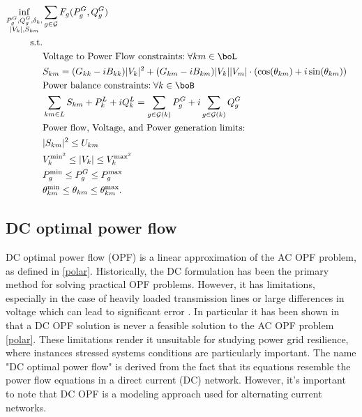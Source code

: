 \documentclass[11pt,a4paper,oneside,openany]{book}
\numberwithin{definition}{section}
\numberwithin{theorem}{section}
\numberwithin{problem}{section}
\begin{document}
\begin{adjustwidth}{-1.5cm}{-1.5cm}      

\begin{align}
\label{polar}
\inf_{\substack{P^G_g, Q^G_g, \delta_k, \\ |V_k|,S_{km}}} & \sum_{g \in \mathcal{G}}{F_g(P_g^G, Q_g^G)} \\
\text{s.t.}&  \nonumber 
\\
& \text{Voltage to Power Flow constraints:} \; \forall km \in \boL \nonumber \\ 
&  S_{km} = (G_{kk}-iB_{kk})|V_k|^2 + (G_{km}-iB_{km})|V_k||V_m|  \cdot (\cos(\theta_{km}) + i \sin(\theta_{km})) \label{constr: voltage to power}
     \\
& \text{Power balance constraints:} \;  \forall k\in \boB  \nonumber \\
& \sum_{km \in L}S_{km}+P_k^L+iQ_k^L = \sum_{g \in \mathcal{G}(k)}{P_g^G} + i\sum_{g \in \mathcal{G}(k)}{Q_g^G}\\
& \text{Power flow, Voltage, and Power generation limits:} & \nonumber  \\
& |S_{km}|^2 \leq U_{km} \\ \label{polar: voltage magnitude constraint}
&V_k^{\text{min}^2} \leq |V_k| \leq V_k^{\text{max}^2} \\
& P_g^{\text{min}} \leq P_g^G \leq P_g^{\text{max}}   \\
& \theta_{km}^{\text{min}} \leq \theta_{km} \leq \theta_{km}^\text{max} .
\end{align}
\end{adjustwidth}

\subsection{DC optimal power flow}
DC optimal power flow (OPF) is a linear approximation  of the AC OPF problem, as defined in  \eqref{polar}. Historically, the DC formulation has been the primary method for solving practical OPF problems. However, it has limitations, especially in the case of heavily loaded transmission lines or large differences in voltage which can lead to significant error \cite{DCrevisitedarticle}. In particular it has been shown in \cite{DCisACinfeasible} that a DC OPF solution is never a feasible solution to the AC OPF problem \eqref{polar}. These limitations render it unsuitable for studying power grid resilience, where instances stressed systems conditions are particularly important.
The name "DC optimal power flow" is derived from the fact that its equations resemble the power flow equations in a direct current (DC) network. However, it's important to note that DC OPF is a modeling approach used for alternating current networks.
\end{document}
